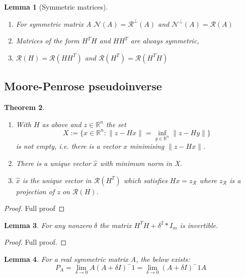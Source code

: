 \documentclass[a4paper]{article}
\theoremstyle{break}
\newtheorem{theorem}{Theorem}[section]
\newtheorem{lemma}[theorem]{Lemma}
\newcommand{\R}{\mathbb{R}}
\newcommand{\Nu}{\mathcal{N}}
\newcommand{\Ra}{\mathcal{R}}
\begin{document}
\begin{lemma}[Symmetric matrices]
\begin{enumerate}
    \item For symmetric matrix A $\Nu(A) = \Ra^\perp(A)$ and $\Nu^\perp(A) = \Ra(A)$
    \item Matrices of the form $H^T H$ and $H H^T$ are always symmetric,
    \item $\Ra(H) = \Ra(H H^T)$ and $\Ra(H^T) = \Ra(H^T H)$
\end{enumerate}
\end{lemma}

\subsection{Moore-Penrose pseudoinverse}

\begin{theorem}
\begin{enumerate}
    \item With $H$ as above and $z \in \R^n$ the set
        \begin{equation*}
        X := \{ x \in \R^n : \| z - H x \| = \inf\limits_{y \in \R^n} \| z - H y \| \}
        \end{equation*}
        is not empty, i.e. there is a vector $x$ minimising $\| z - H x \|$.
    \item There is a unique vector $\hat{x}$ with minimum norm in X.
    \item $\hat{x}$ is the unique vector in $\Ra(H^T)$ which satisfies $Hx = z_\Ra$ where $z_\Ra$ is a projection of z on $\Ra(H)$.
\end{enumerate}
\end{theorem}
\begin{proof}
    Full proof
\end{proof}

\begin{lemma}
    For any nonzero $\delta$ the matrix $H^T H + \delta^2 * I_m$ is invertible.
\end{lemma}
\begin{proof}
    Full proof.
\end{proof}

\begin{lemma}
    For a real symmetric matrix A, the below exists:
    \begin{equation}
        P_A = \lim_{\delta \to 0} A ( A + \delta I) ^-1
            = \lim_{\delta \to 0} ( A + \delta I) ^-1 A
    \end{equation}
    
\end{lemma}
\pagebreak
\end{document}

